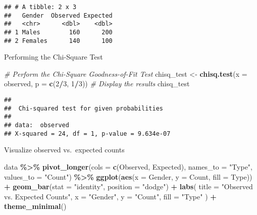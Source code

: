 \documentclass[
]{article}
\newenvironment{Shaded}{\begin{snugshade}}{\end{snugshade}}
\newcommand{\AttributeTok}[1]{\textcolor[rgb]{0.13,0.29,0.53}{#1}}
\newcommand{\CommentTok}[1]{\textcolor[rgb]{0.56,0.35,0.01}{\textit{#1}}}
\newcommand{\DecValTok}[1]{\textcolor[rgb]{0.00,0.00,0.81}{#1}}
\newcommand{\FunctionTok}[1]{\textcolor[rgb]{0.13,0.29,0.53}{\textbf{#1}}}
\newcommand{\NormalTok}[1]{#1}
\newcommand{\OtherTok}[1]{\textcolor[rgb]{0.56,0.35,0.01}{#1}}
\newcommand{\SpecialCharTok}[1]{\textcolor[rgb]{0.81,0.36,0.00}{\textbf{#1}}}
\newcommand{\StringTok}[1]{\textcolor[rgb]{0.31,0.60,0.02}{#1}}
\begin{document}
\begin{verbatim}
## # A tibble: 2 x 3
##   Gender  Observed Expected
##   <chr>      <dbl>    <dbl>
## 1 Males        160      200
## 2 Females      140      100
\end{verbatim}

Performing the Chi-Square Test

\begin{Shaded}
\begin{Highlighting}[]
\CommentTok{\# Perform the Chi{-}Square Goodness{-}of{-}Fit Test}
\NormalTok{chisq\_test }\OtherTok{\textless{}{-}} \FunctionTok{chisq.test}\NormalTok{(}\AttributeTok{x =}\NormalTok{ observed, }\AttributeTok{p =} \FunctionTok{c}\NormalTok{(}\DecValTok{2}\SpecialCharTok{/}\DecValTok{3}\NormalTok{, }\DecValTok{1}\SpecialCharTok{/}\DecValTok{3}\NormalTok{))}
\CommentTok{\# Display the results}
\NormalTok{chisq\_test}
\end{Highlighting}
\end{Shaded}

\begin{verbatim}
## 
##  Chi-squared test for given probabilities
## 
## data:  observed
## X-squared = 24, df = 1, p-value = 9.634e-07
\end{verbatim}

Visualize observed vs.~expected counts

\begin{Shaded}
\begin{Highlighting}[]
\NormalTok{data }\SpecialCharTok{\%\textgreater{}\%}
  \FunctionTok{pivot\_longer}\NormalTok{(}\AttributeTok{cols =} \FunctionTok{c}\NormalTok{(Observed, Expected), }\AttributeTok{names\_to =} \StringTok{"Type"}\NormalTok{, }\AttributeTok{values\_to =} \StringTok{"Count"}\NormalTok{) }\SpecialCharTok{\%\textgreater{}\%}
  \FunctionTok{ggplot}\NormalTok{(}\FunctionTok{aes}\NormalTok{(}\AttributeTok{x =}\NormalTok{ Gender, }\AttributeTok{y =}\NormalTok{ Count, }\AttributeTok{fill =}\NormalTok{ Type)) }\SpecialCharTok{+}
  \FunctionTok{geom\_bar}\NormalTok{(}\AttributeTok{stat =} \StringTok{"identity"}\NormalTok{, }\AttributeTok{position =} \StringTok{"dodge"}\NormalTok{) }\SpecialCharTok{+}
  \FunctionTok{labs}\NormalTok{(}
    \AttributeTok{title =} \StringTok{"Observed vs. Expected Counts"}\NormalTok{,}
    \AttributeTok{x =} \StringTok{"Gender"}\NormalTok{,}
    \AttributeTok{y =} \StringTok{"Count"}\NormalTok{,}
    \AttributeTok{fill =} \StringTok{"Type"}
\NormalTok{  ) }\SpecialCharTok{+}
  \FunctionTok{theme\_minimal}\NormalTok{()}
\end{Highlighting}
\end{Shaded}
\end{document}
